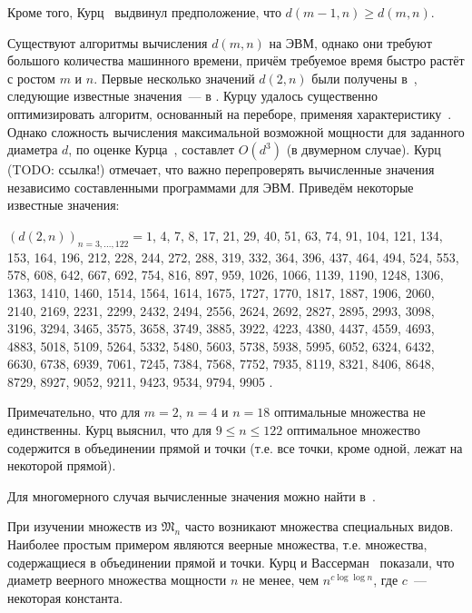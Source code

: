 Кроме того, Курц~\cite{kurz2008bounds} выдвинул предположение, что $d(m - 1, n) \geq d(m, n)$.




Существуют алгоритмы вычисления $d(m,n)$ на ЭВМ, однако они требуют большого количества машинного времени,
причём требуемое время быстро растёт с ростом $m$ и $n$.
Первые несколько значений $d(2,n)$ были получены в~\cite{harborth1998integral},
следующие известные значения~--- в \cite{kurz2005characteristic,kurz2006konstruktion,kurz2008minimum,kurz2008bounds,our-mz-rus}.
Курцу удалось существенно оптимизировать алгоритм, основанный на переборе, применяя характеристику~\cite{kurz2005characteristic,kreisel2008heptagon}.
Однако сложность вычисления максимальной возможной мощности для заданного диаметра $d$, по оценке Курца~\cite{kreisel2008heptagon},
составлет $O(d^3)$ (в двумерном случае).
Курц (TODO: ссылка!) отмечает, что важно перепроверять вычисленные значения независимо составленными программами для ЭВМ.
Приведём некоторые известные значения:

\begin{proposition}
\label{proposition:d(2,n)}
\end{proposition}
$(d(2, n))_{n=3,...,122} = 1$, 4, 7, 8, 17, 21, 29, 40, 51, 63, 74, 91, 104, 121,
134, 153, 164,
196, 212, 228, 244, 272, 288, 319, 332, 364, 396, 437, 464, 494, 524, 553, 578, 608,
642, 667, 692, 754, 816, 897, 959, 1026, 1066, 1139, 1190,  1248, 1306, 1363, 1410,
1460, 1514, 1564, 1614, 1675, 1727, 1770, 1817, 1887, 1906, 2060, 2140, 2169,
2231, 2299, 2432, 2494, 2556, 2624, 2692, 2827, 2895, 2993, 3098, 3196, 3294,
3465, 3575, 3658, 3749, 3885, 3922, 4223, 4380, 4437, 4559, 4693, 4883,
5018, 5109, 5264, 5332, 5480, 5603, 5738, 5938, 5995, 6052,
6324, 6432, 6630, 6738, 6939, 7061, 7245, 7384, 7568, 7752, 7935, 8119, 8321,
8406, 8648, 8729, 8927, 9052, 9211, 9423, 9534, 9794, 9905
.

Примечательно, что для $m=2$, $n=4$ и $n=18$ оптимальные множества не единственны.
Курц выяснил, что для $9 \leq n \leq 122$ оптимальное множество содержится
в объединении прямой и точки (т.е. все точки, кроме одной, лежат на некоторой прямой).

Для многомерного случая вычисленные значения можно найти в~\cite{kurz2008bounds}.


При изучении множеств из $\mathfrak{M}_n$ часто возникают множества специальных видов.
Наиболее простым примером являются веерные множества, т.е. множества, содержащиеся в объединении прямой и точки.
Курц и Вассерман~\cite{kurz2008minimum} показали, что диаметр веерного множества мощности $n$
не менее, чем $n^{c \log \log n}$, где $c$~--- некоторая константа.

